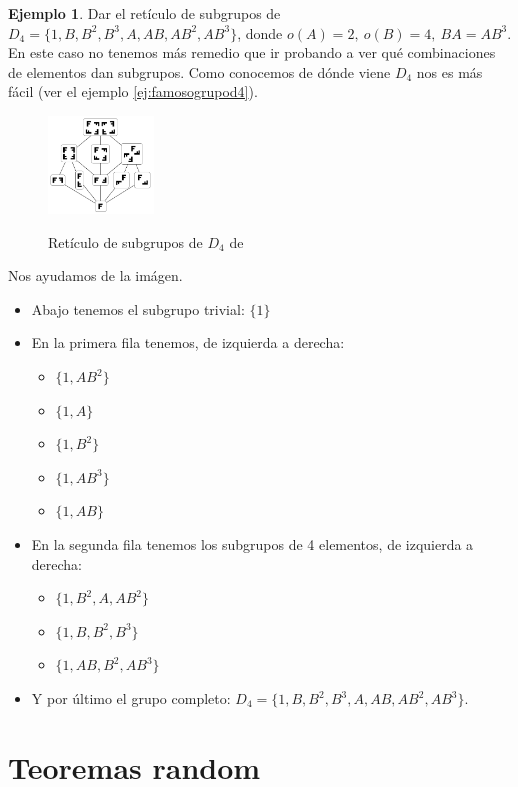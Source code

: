 \documentclass{book}
\theoremstyle{definition}
\newtheorem{ej}{Ejemplo}
\theoremstyle{remark}
\begin{document}
\begin{ej}
	Dar el retículo de subgrupos de $D_4 = \{1, B, B^2, B^3, A, AB, AB^2, AB^3\}$, donde $o(A) = 2,\ o(B) = 4,\ BA=AB^3$. En este caso no tenemos más remedio que ir probando a ver qué combinaciones de elementos dan subgrupos. Como conocemos de dónde viene $D_4$ nos es más fácil (ver el ejemplo \ref{ej:famosogrupod4}).
	
	
	\begin{figure}[h]
		\centering
		\includegraphics[width=0.25\textwidth]{reticulo-D4}
		\label{fig:reticuloD4}
		\caption{Retículo de subgrupos de $D_4$ de \cite{d4sub}}
	\end{figure}

	Nos ayudamos de la imágen.
		\begin{itemize}
			\item Abajo tenemos el subgrupo trivial: $\{1\}$
			\item En la primera fila tenemos, de izquierda a derecha:
			\begin{itemize}
				\item $\{1, AB^2\}$
				\item $\{1, A\}$
				\item $\{1, B^2\}$
				\item $\{1, AB^3\}$
				\item $\{1, AB\}$
			\end{itemize}
			\item En la segunda fila tenemos los subgrupos de 4 elementos, de izquierda a derecha:
			\begin{itemize}
				\item $\{1, B^2, A, AB^2\}$
				\item $\{1, B, B^2, B^3\}$
				\item $\{1, AB, B^2, AB^3\}$
			\end{itemize}
			\item Y por último el grupo completo: $D_4 = \{1, B, B^2, B^3, A, AB, AB^2, AB^3\}$.
		\end{itemize}
\end{ej}

\section{Teoremas random}
\end{document}
